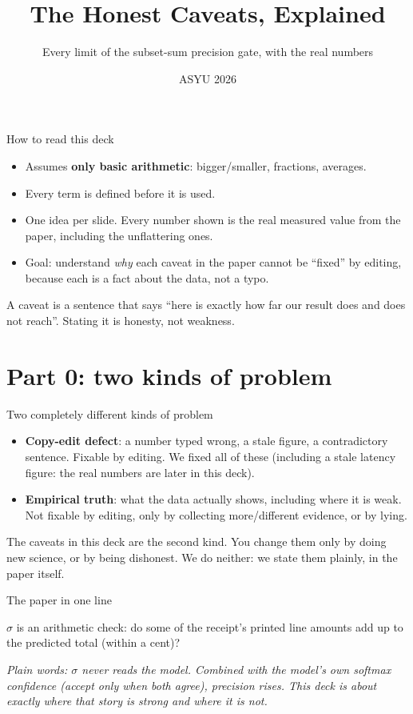 \documentclass[aspectratio=169]{beamer}
\title{The Honest Caveats, Explained}
\subtitle{Every limit of the subset-sum precision gate, with the real numbers}
\author{ASYU 2026}
\date{}
\newcommand{\bigq}[1]{\begin{center}{\Large #1}\end{center}}
\newcommand{\keybox}[1]{\begin{center}\colorbox{grey!15}{\parbox{0.92\linewidth}{\centering #1}}\end{center}}
\newcommand{\plain}[1]{\textit{\textcolor{sig}{Plain words:} #1}}
\begin{document}
\frame{\titlepage}

\begin{frame}{How to read this deck}
\begin{itemize}
\item Assumes \textbf{only basic arithmetic}: bigger/smaller, fractions,
averages.
\item Every term is defined before it is used.
\item One idea per slide. Every number shown is the real measured value
from the paper, including the unflattering ones.
\item Goal: understand \emph{why} each caveat in the paper cannot be
``fixed'' by editing, because each is a fact about the data, not a typo.
\end{itemize}
\vspace{1em}
\keybox{A caveat is a sentence that says ``here is exactly how far our
result does and does not reach''. Stating it is honesty, not weakness.}
\end{frame}

\section{Part 0: two kinds of problem}
\begin{frame}{Two completely different kinds of problem}
\begin{itemize}
\item \textbf{Copy-edit defect}: a number typed wrong, a stale figure, a
contradictory sentence. \textcolor{ok}{Fixable by editing.} We fixed all
of these (including a stale latency figure: the real numbers are later
in this deck).
\item \textbf{Empirical truth}: what the data actually shows, including
where it is weak. \textcolor{bad}{Not fixable by editing}, only by
collecting more/different evidence, or by lying.
\end{itemize}
\vspace{1em}
\keybox{The caveats in this deck are the second kind. You change them
only by doing new science, or by being dishonest. We do neither: we
state them plainly, in the paper itself.}
\end{frame}

\begin{frame}{The paper in one line}
\bigq{$\sigma$ is an arithmetic check: do some of the receipt's printed
line amounts add up to the predicted total (within a cent)?}
\vspace{0.6em}
\plain{$\sigma$ never reads the model. Combined with the model's own
softmax confidence (accept only when \emph{both} agree), precision rises.
This deck is about exactly where that story is strong and where it is
not.}
\end{frame}
\end{document}
